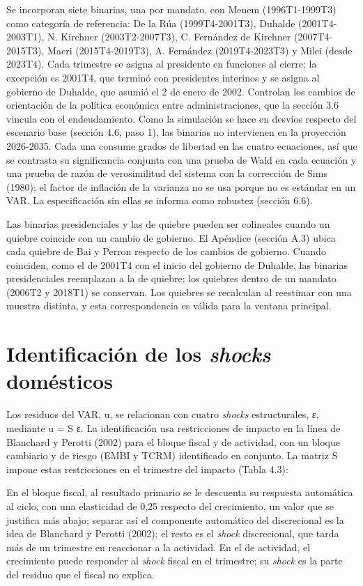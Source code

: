 Se incorporan siete binarias, una por mandato, con Menem (1996T1-1999T3)
como categoría de referencia: De la Rúa (1999T4-2001T3), Duhalde
(2001T4-2003T1), N. Kirchner (2003T2-2007T3), C. Fernández de Kirchner
(2007T4-2015T3), Macri (2015T4-2019T3), A. Fernández (2019T4-2023T3) y
Milei (desde 2023T4). Cada trimestre se asigna al presidente en
funciones al cierre; la excepción es 2001T4, que terminó con presidentes
interinos y se asigna al gobierno de Duhalde, que asumió el 2 de enero
de 2002. Controlan los cambios de orientación de la política económica
entre administraciones, que la sección 3.6 vincula con el endeudamiento.
Como la simulación se hace en desvíos respecto del escenario base
(sección 4.6, paso 1), las binarias no intervienen en la proyección
2026-2035. Cada una consume grados de libertad en las cuatro ecuaciones,
así que se contrasta su significancia conjunta con una prueba de Wald en
cada ecuación y una prueba de razón de verosimilitud del sistema con la
corrección de Sims (1980); el factor de inflación de la varianza no se
usa porque no es estándar en un VAR. La especificación sin ellas se
informa como robustez (sección 6.6).

Las binarias presidenciales y las de quiebre pueden ser colineales
cuando un quiebre coincide con un cambio de gobierno. El Apéndice
(sección A.3) ubica cada quiebre de Bai y Perron respecto de los cambios
de gobierno. Cuando coinciden, como el de 2001T4 con el inicio del
gobierno de Duhalde, las binarias presidenciales reemplazan a la de
quiebre; los quiebres dentro de un mandato (2006T2 y 2018T1) se
conservan. Los quiebres se recalculan al reestimar con una muestra
distinta, y esta correspondencia es válida para la ventana principal.

\section{\texorpdfstring{Identificación de los \emph{shocks}
domésticos}{Identificación de los shocks domésticos}}

Los residuos del VAR, u, se relacionan con cuatro \emph{shocks}
estructurales, ε, mediante u = S ε. La identificación usa restricciones
de impacto en la línea de Blanchard y Perotti (2002) para el bloque
fiscal y de actividad, con un bloque cambiario y de riesgo (EMBI y TCRM)
identificado en conjunto. La matriz S impone estas restricciones en el
trimestre del impacto (Tabla 4.3):

En el bloque fiscal, al resultado primario se le descuenta su respuesta
automática al ciclo, con una elasticidad de 0,25 respecto del
crecimiento, un valor que se justifica más abajo; separar así el
componente automático del discrecional es la idea de Blanchard y Perotti
(2002); el resto es el \emph{shock} discrecional, que tarda más de un
trimestre en reaccionar a la actividad. En el de actividad, el
crecimiento puede responder al \emph{shock} fiscal en el trimestre; su
\emph{shock} es la parte del residuo que el fiscal no explica.

